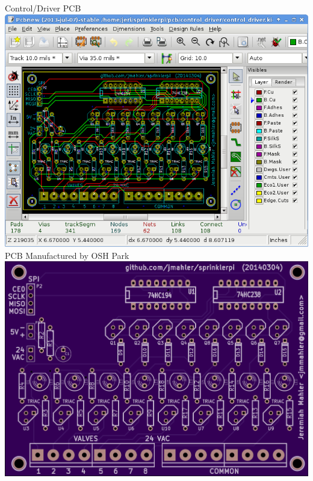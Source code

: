 \documentclass{article}
\begin{document}
\pagebreak

\begin{center}

{\fontsize{20}{80}\selectfont Control/Driver PCB} \\
\vspace*{0.3in}
\includegraphics[scale=0.55]{img/pcb-cd-kicad.png} \\
\vspace*{0.5in}
{\fontsize{20}{80}\selectfont PCB Manufactured by OSH Park} \\
\vspace*{0.3in}
\includegraphics[scale=0.12]{img/pcb-cd-top.png}

\end{center}
\end{document}
